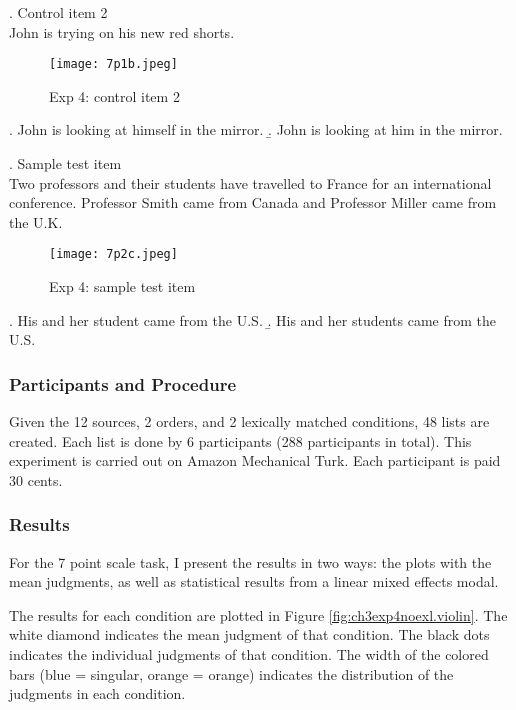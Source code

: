 \documentclass[
  11pt          %
  ,letterpaper  %
  ,center       %
  ,noupper      %
  ]{uconnthesis2}
\begin{document}
\ex. Control item 2 \\
John is trying on his new red shorts.
\vspace{-0.5em}
\begin{figure}[htb!] 
\texttt{[image: 7p1b.jpeg]} \centering
\caption{Exp 4: control item 2}
\label{fig:exp4b}
\end{figure}\vspace{-0.5em}
\a. John is looking at himself in the mirror.	
\b. John is looking at him in the mirror.

\ex.\label{7p1c} Sample test item\\
Two professors and their students have travelled to France for an international conference. Professor Smith came from Canada and Professor Miller came from the U.K.
\vspace{-0.5em}
\begin{figure}[htb!]
\texttt{[image: 7p2c.jpeg]} \centering
\caption{Exp 4: sample test item}
\label{fig:exp4c}
\end{figure}
\vspace{-1em}
\a. His and her student came from the U.S.
\b. His and her students came from the U.S.

\subsubsection{Participants and Procedure}

Given the 12 sources, 2 orders, and 2 lexically matched conditions, 48 lists are created. Each list is done by 6 participants (288 participants in total). This experiment is carried out on Amazon Mechanical Turk. Each participant is paid 30 cents. 

\subsubsection{Results}

For the 7 point scale task, I present the results in two ways:  the plots with the mean judgments, as well as statistical results from a linear mixed effects modal.

The results for each condition are plotted in Figure \ref{fig:ch3exp4noexl.violin}. The white diamond indicates the mean judgment of that condition. The black dots indicates the individual judgments of that condition. The width of the colored bars (blue = singular, orange = orange) indicates the distribution of the judgments in each condition.
\end{document}
